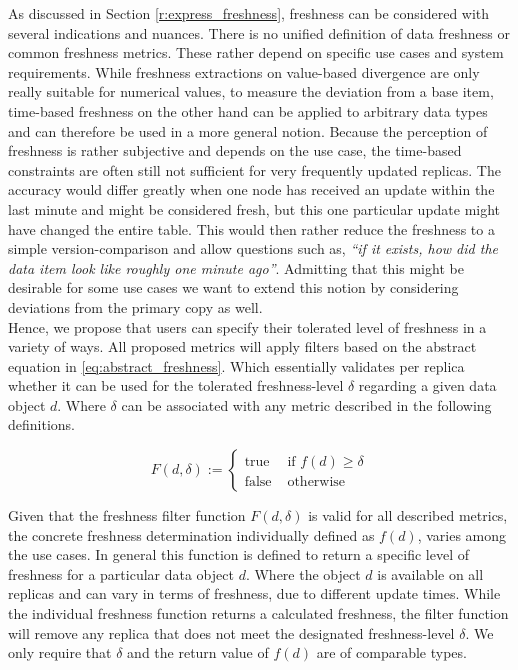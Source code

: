 As discussed in Section \ref{r:express_freshness}, freshness can be considered with several indications and nuances.
There is no unified definition of data freshness or common freshness metrics.
These rather depend on specific use cases and system requirements.
While freshness extractions on value-based divergence are only really suitable for numerical values,
to measure the deviation from a base item, time-based freshness on the other hand can be applied to arbitrary data types and can therefore be used 
in a more general notion.
Because the perception of freshness is rather subjective and depends on the use case, the time-based constraints are often still not sufficient for very frequently
updated replicas.
The accuracy would differ greatly when one node has received an update within the last minute and might be considered fresh, but this one particular 
update might have changed the entire table. 
This would then rather reduce the freshness to a simple version-comparison and allow questions such as, \textit{``if it exists, how did the data item look like roughly one minute ago''}.
Admitting that this might be desirable for some use cases we want to extend this notion by considering deviations from the primary copy as well.\\
Hence, we propose that users can specify their tolerated level of freshness in a variety of ways. 
All proposed metrics will apply filters based on the abstract equation in \ref{eq:abstract_freshness}. 
Which essentially validates per replica whether it can be used for the tolerated freshness-level $\delta$ regarding a given data object $d$.
Where $\delta$ can be associated with any metric described in the following definitions.

\begin{equation} \label{eq:abstract_freshness}
    F(d, \delta) :=
        \begin{cases}
            \text{true } & \text{if } f(d) \geq \delta\\
            \text{false } & \text{otherwise }
        \end{cases}
\end{equation}


Given that the freshness filter function $F(d, \delta)$ is valid for all described metrics, the concrete freshness determination individually defined as $f(d)$, 
varies among the use cases.
In general this function is defined to return a specific level of freshness for a particular data object $d$. 
Where the object $d$ is available on all replicas and can vary in terms of freshness, due to different update times.
While the individual freshness function returns a calculated freshness, the filter function will remove any replica that does not meet the designated freshness-level $\delta$. 
We only require that $\delta$ and the return value of $f(d)$ are of comparable types.


